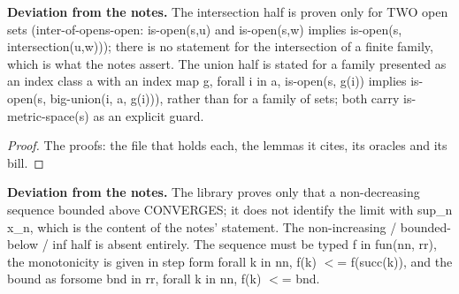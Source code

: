 %
\noindent\textbf{Deviation from the notes.} The intersection half is proven only for TWO open sets (inter-of-opens-open: is-open(s,u) and is-open(s,w) implies is-open(s, intersection(u,w))); there is no statement for the intersection of a finite family, which is what the notes assert. The union half is stated for a family presented as an index class a with an index map g, forall i in a, is-open(s, g(i)) implies is-open(s, big-union(i, a, g(i))), rather than for a family of sets; both carry is-metric-space(s) as an explicit guard.
%
\renewcommand{\thethm}{3.7}
\begin{prop}\label{thm:monotone-convergence-rr}
%
%
\end{prop}
%
\begin{proof}
%
The proofs: the file that holds each, the lemmas it cites, its oracles and its bill.
%
%
%
%
\end{proof}
%
\noindent\textbf{Deviation from the notes.} The library proves only that a non-decreasing sequence bounded above CONVERGES; it does not identify the limit with sup\_n x\_n, which is the content of the notes' statement. The non-increasing / bounded-below / inf half is absent entirely. The sequence must be typed f in fun(nn, rr), the monotonicity is given in step form forall k in nn, f(k) $<$= f(succ(k)), and the bound as forsome bnd in rr, forall k in nn, f(k) $<$= bnd.
%
\renewcommand{\thethm}{3.9}
